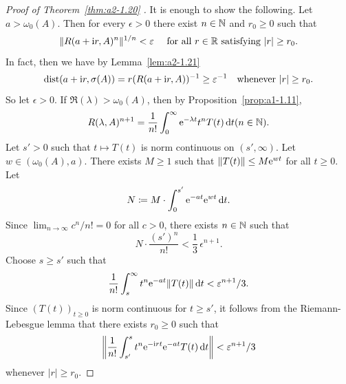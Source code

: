 \begin{proof}[Proof of Theorem~\ref{thm:a2-1.20}  ]
It is enough to show the following.
Let $a > \omega_{0}(A)$.
Then for every $\epsilon > 0$ there exist $n \in \mathbb{N}$ and $r_0 \geq 0$ such that
\[
\|R(a+ \iu r,A)^n\|^{1/n} < \epsilon \quad  \text{ for all } r \in \R \text{ satisfying $|r| \geq r_{0}$.}
\]
In fact, then we have by Lemma~\ref{lem:a2-1.21} 
\[
\text{dist}(a+\iu r,\sigma(A)) = r(R(a+ \iu r,A))^{-1} \geq \epsilon^{-1} \quad \text{whenever $|r| \geq r_{0}$.}
\]
So let $\epsilon > 0$.
If\/ $\Re(\lambda) > \omega_{0}(A)$, then by Proposition~\ref{prop:a1-1.11},
\[
R(\lambda,A)^{n+1} = \frac{1}{n!}\int_0^\infty \mathrm{e}^{-\lambda t}t^nT(t) \mathop{}\!\mathrm{d}{t} (n \in \mathbb{N}).
\]
Let $s' > 0$ such that $t \mapsto T(t)$ is norm continuous on $(s',\infty)$.
Let $w \in (\omega_{0}(A),a)$.
There exists $M \geq 1$ such that $\|T(t)\| \leq M\eu^{wt}$ for all $t \geq 0$.
Let 
\[
N \coloneq M\cdot\int_{0}^{s'} \mathrm{e}^{-at}\mathrm{e}^{wt} \mathop{}\!\mathrm{d}{t}.
\]
Since $\lim_{n\to\infty} c^n/n! = 0$ for all $c > 0$, there exists $n \in \mathbb{N}$ such that 
%
\[
	N\cdot \frac{(s')^n}{n!} < \frac{1}{3}\,\epsilon^{n+1}.
\]
%
Choose $s \geq s'$ such that 
%
\[
	\frac{1}{n!}\int_{s}^{\infty} t^n\eu^{-at}\|T(t)\| \dt < \epsilon^{n+1}/3 .
\]
%
Since $(T(t))_{t\geq 0}$ is norm continuous for $t \geq s'$, it follows from the Riemann-Lebesgue lemma that there exists $r_{0} \geq 0$ such that 
\[
\left\lVert \frac{1}{n!}\int_{s'}^s t^{n}\eu^{-\iu rt}\eu^{-at}T(t) \dt \right\lVert  < \epsilon^{n+1}/3
\]
 whenever $|r| \geq r_{0}$.


\end{proof}
